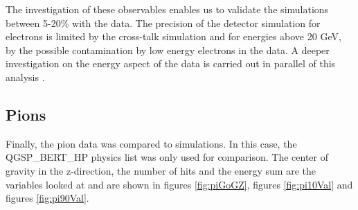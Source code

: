 The investigation of these observables enables us to validate the simulations between 5-20\% with the data. The precision of the detector simulation for electrons is limited by the cross-talk simulation and for energies above 20 GeV, by the possible contamination by low energy electrons in the data. A deeper investigation on the energy aspect of the data is carried out in parallel of this analysis \cite{AmbraEnergy}.

\subsection{Pions}

Finally, the pion data was compared to simulations. In this case, the QGSP\_BERT\_HP physics list was only used for comparison. The center of gravity in the z-direction, the number of hits and the energy sum are the variables looked at and are shown in figures \ref{fig:piGoGZ}, figures \ref{fig:pi10Val} and figures \ref{fig:pi90Val}.

